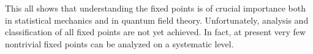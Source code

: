 This all shows that understanding the fixed points is of crucial importance both
in statistical mechanics and in quantum field theory. Unfortunately, analysis and
classification of all fixed points are not yet achieved. In fact, at present very
few nontrivial fixed points can be analyzed on a systematic level.
